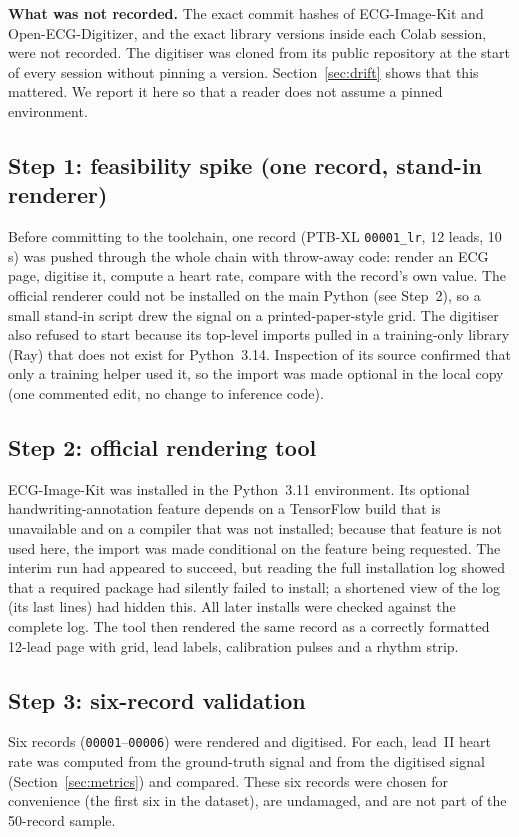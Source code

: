 \textbf{What was not recorded.} The exact commit hashes of ECG-Image-Kit and Open-ECG-Digitizer, and the exact library versions inside each Colab session, were not recorded. The digitiser was cloned from its public repository at the start of every session without pinning a version. Section~\ref{sec:drift} shows that this mattered. We report it here so that a reader does not assume a pinned environment.

\subsection{Step 1: feasibility spike (one record, stand-in renderer)}
Before committing to the toolchain, one record (PTB-XL \texttt{00001\_lr}, 12 leads, 10\,s) was pushed through the whole chain with throw-away code: render an ECG page, digitise it, compute a heart rate, compare with the record's own value. The official renderer could not be installed on the main Python (see Step~2), so a small stand-in script drew the signal on a printed-paper-style grid. The digitiser also refused to start because its top-level imports pulled in a training-only library (Ray) that does not exist for Python~3.14. Inspection of its source confirmed that only a training helper used it, so the import was made optional in the local copy (one commented edit, no change to inference code).

\subsection{Step 2: official rendering tool}
ECG-Image-Kit \citep{ref1} was installed in the Python~3.11 environment. Its optional handwriting-annotation feature depends on a TensorFlow build that is unavailable and on a compiler that was not installed; because that feature is not used here, the import was made conditional on the feature being requested. The interim run had appeared to succeed, but reading the full installation log showed that a required package had silently failed to install; a shortened view of the log (its last lines) had hidden this. All later installs were checked against the complete log. The tool then rendered the same record as a correctly formatted 12-lead page with grid, lead labels, calibration pulses and a rhythm strip.

\subsection{Step 3: six-record validation}
Six records (\texttt{00001}--\texttt{00006}) were rendered and digitised. For each, lead~II heart rate was computed from the ground-truth signal and from the digitised signal (Section~\ref{sec:metrics}) and compared. These six records were chosen for convenience (the first six in the dataset), are undamaged, and are not part of the 50-record sample.

